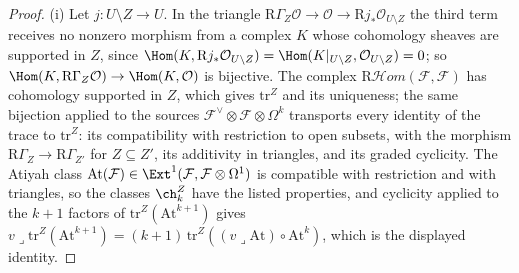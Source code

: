 \begin{proof}
(i) Let $j\colon U\setminus Z\to U$. In the triangle $\mathrm{R}\Gamma_{Z}\mathcal{O}\to\mathcal{O}\to\mathrm{R}j_{*}\mathcal{O}_{U\setminus Z}$ the third term receives no nonzero morphism from a complex $K$ whose cohomology sheaves are supported in $Z$, since $\Hom(K,\mathrm{R}j_{*}\mathcal{O}_{U\setminus Z})=\Hom(K|_{U\setminus Z},\mathcal{O}_{U\setminus Z})=0$; so $\Hom(K,\mathrm{R}\Gamma_{Z}\mathcal{O})\to\Hom(K,\mathcal{O})$ is bijective. The complex $\mathrm{R}\mathcal{H}om(\mathcal{F},\mathcal{F})$ has cohomology supported in $Z$, which gives $\mathrm{tr}^{Z}$ and its uniqueness; the same bijection applied to the sources $\mathcal{F}^{\vee}\otimes\mathcal{F}\otimes\Omega^{k}$ transports every identity of the trace to $\mathrm{tr}^{Z}$: its compatibility with restriction to open subsets, with the morphism $\mathrm{R}\Gamma_{Z}\to\mathrm{R}\Gamma_{Z'}$ for $Z\subseteq Z'$, its additivity in triangles, and its graded cyclicity. The Atiyah class $\mathrm{At}(\mathcal{F})\in\Ext^{1}(\mathcal{F},\mathcal{F}\otimes\Omega^{1})$ is compatible with restriction and with triangles, so the classes $\ch^{Z}_{k}$ have the listed properties, and cyclicity applied to the $k+1$ factors of $\mathrm{tr}^{Z}(\mathrm{At}^{k+1})$ gives $v\lrcorner\mathrm{tr}^{Z}(\mathrm{At}^{k+1})=(k+1)\,\mathrm{tr}^{Z}((v\lrcorner\mathrm{At})\circ\mathrm{At}^{k})$, which is the displayed identity.


\end{proof}
